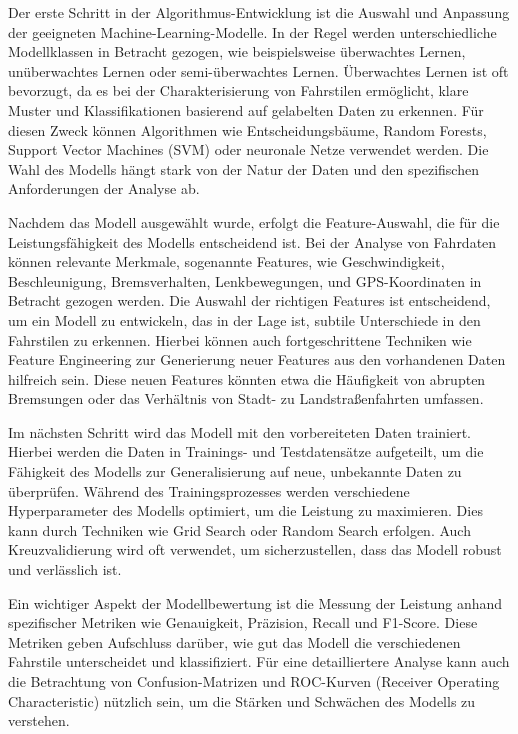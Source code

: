 \documentclass[oneside]{ausarbeitung}
\begin{document}
\begin{itemize}
  Der erste Schritt in der Algorithmus-Entwicklung ist die Auswahl und Anpassung der geeigneten Machine-Learning-Modelle. In der Regel 
  werden unterschiedliche Modellklassen in Betracht gezogen, wie beispielsweise überwachtes Lernen, unüberwachtes Lernen oder 
  semi-überwachtes Lernen. Überwachtes Lernen ist oft bevorzugt, da es bei der Charakterisierung von Fahrstilen ermöglicht, 
  klare Muster und Klassifikationen basierend auf gelabelten Daten zu erkennen. Für diesen Zweck können Algorithmen wie 
  Entscheidungsbäume, Random Forests, Support Vector Machines (SVM) oder neuronale Netze verwendet werden. Die Wahl des 
  Modells hängt stark von der Natur der Daten und den spezifischen Anforderungen der Analyse ab.
  
  Nachdem das Modell ausgewählt wurde, erfolgt die Feature-Auswahl, die für die Leistungsfähigkeit des Modells entscheidend ist. Bei der 
  Analyse von Fahrdaten können relevante Merkmale, sogenannte Features, wie Geschwindigkeit, Beschleunigung, Bremsverhalten, Lenkbewegungen, 
  und GPS-Koordinaten in Betracht gezogen werden. Die Auswahl der richtigen Features ist entscheidend, um ein Modell zu entwickeln, 
  das in der Lage ist, subtile Unterschiede in den Fahrstilen zu erkennen. Hierbei können auch fortgeschrittene Techniken wie Feature 
  Engineering zur Generierung neuer Features aus den vorhandenen Daten hilfreich sein. Diese neuen Features könnten etwa die Häufigkeit 
  von abrupten Bremsungen oder das Verhältnis von Stadt- zu Landstraßenfahrten umfassen.
  
  Im nächsten Schritt wird das Modell mit den vorbereiteten Daten trainiert. Hierbei werden die Daten in Trainings- und Testdatensätze 
  aufgeteilt, um die Fähigkeit des Modells zur Generalisierung auf neue, unbekannte Daten zu überprüfen. Während des Trainingsprozesses 
  werden verschiedene Hyperparameter des Modells optimiert, um die Leistung zu maximieren. Dies kann durch Techniken wie Grid Search oder 
  Random Search erfolgen. Auch Kreuzvalidierung wird oft verwendet, um sicherzustellen, dass das Modell robust und verlässlich ist.
  
  Ein wichtiger Aspekt der Modellbewertung ist die Messung der Leistung anhand spezifischer Metriken wie Genauigkeit, Präzision, 
  Recall und F1-Score. Diese Metriken geben Aufschluss darüber, wie gut das Modell die verschiedenen Fahrstile unterscheidet und 
  klassifiziert. Für eine detailliertere Analyse kann auch die Betrachtung von Confusion-Matrizen und ROC-Kurven (Receiver Operating 
  Characteristic) nützlich sein, um die Stärken und Schwächen des Modells zu verstehen.
  

\end{itemize}
\end{document}
